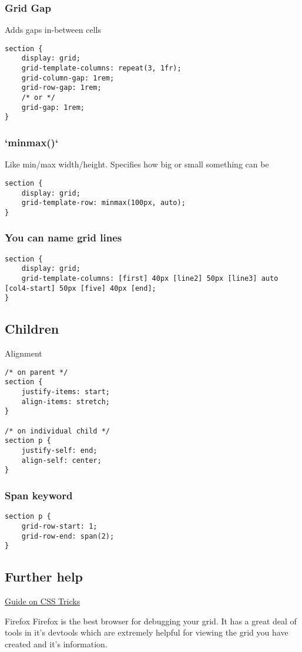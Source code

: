 \subsubsection{Grid Gap}

Adds gaps in-between cells

\begin{verbatim}
section {
    display: grid;
    grid-template-columns: repeat(3, 1fr);
    grid-column-gap: 1rem;
    grid-row-gap: 1rem;
    /* or */
    grid-gap: 1rem;
}
\end{verbatim}

\subsubsection{`minmax()`}

Like min/max width/height. Specifies how big or small something can be

\begin{verbatim}
section {
    display: grid;
    grid-template-row: minmax(100px, auto);
}
\end{verbatim}


\subsubsection{You can name grid lines}

\begin{verbatim}
section {
    display: grid;
    grid-template-columns: [first] 40px [line2] 50px [line3] auto [col4-start] 50px [five] 40px [end];
}
\end{verbatim}


\subsection{Children}

Alignment

\begin{verbatim}
/* on parent */
section {
    justify-items: start;
    align-items: stretch;
}

/* on individual child */
section p {
    justify-self: end;
    align-self: center;
}
\end{verbatim}

\subsubsection{Span keyword}

\begin{verbatim}
section p {
    grid-row-start: 1;
    grid-row-end: span(2);
}
\end{verbatim}

\subsection{Further help}

\href{}{Guide on CSS Tricks}

\begin{infobox}{Firefox}
    Firefox is the best browser for debugging your grid. It has a great deal of tools in it's devtools which are extremely helpful for viewing the grid you have created and it's information.
\end{infobox}


